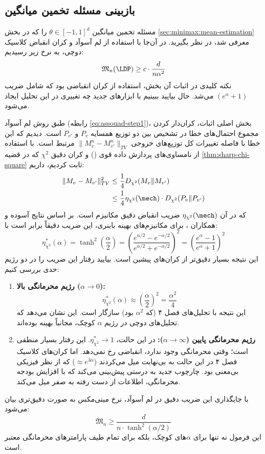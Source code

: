 \subsection{بازبینی مسئله تخمین میانگین}
مسئله تخمین میانگین $\theta \in [-1, 1]^d$ را که در بخش \ref{sec:minimax:mean-estimation} معرفی شد، در نظر بگیرید. در آن‌جا با استفاده از لم آسوآد و کران انقباض کلاسیک دوچی، به نرخ زیر رسیدیم:
\begin{equation}
\mathfrak{M}_n(\text{\LDP}) \ge c \cdot \frac{d}{n \alpha^2}
\end{equation}
نکته کلیدی در اثبات آن بخش، استفاده از کران انقباضی بود که شامل ضریب $(e^\alpha + 1)$ می‌شد. حال بیایید ببینیم با ابزارهای جدید چه تغییری در این تحلیل ایجاد می‌شود.

طبق روش لم آسوآد (رابطه \ref{eq:assouad-step1})، بخش اصلی اثبات، کران‌دار کردن مجموع احتمال‌های خطا در تشخیص بین دو توزیع همسایه $P_v$ و $P_{v'}$ است. دیدیم که این خطا با فاصله تغییرات کل توزیع‌های خروجی $\|M_v^n - M_{v'}^n\|_{TV}$ مرتبط است.
با استفاده از نامساوی‌های پردازش داده قوی () و کران دقیق $\chi^2$ که در قضیه \ref{thm:sharp-chi-square} ثابت کردیم، داریم:
\begin{align}
\|M_v - M_{v'}\|_{TV}^2 &\le \frac{1}{4} D_{\chi^2}(M_v \| M_{v'}) \nonumber \\
&\le \frac{1}{4} \eta_{\chi^2}(\mech) \cdot D_{\chi^2}(P_v \| P_{v'})
\end{align}
که در آن $\eta_{\chi^2}(\mech)$ ضریب انقباض دقیق مکانیزم است. بر اساس نتایج آسوده و همکاران \cite{Asoodeh2024}، برای مکانیزم‌های بهینه باینری، این ضریب دقیقاً برابر است با:
\begin{equation}
\eta_{\chi^2}^*(\alpha) = \tanh^2\left(\frac{\alpha}{2}\right) = \left( \frac{e^{\alpha/2} - e^{-\alpha/2}}{e^{\alpha/2} + e^{-\alpha/2}} \right)^2 = \left( \frac{e^\alpha - 1}{e^\alpha + 1} \right)^2
\end{equation}
این نتیجه بسیار دقیق‌تر از کران‌های پیشین است. بیایید رفتار این ضریب را در دو رژیم حدی بررسی کنیم:

\begin{enumerate}
    \item \textbf{رژیم محرمانگی بالا ($\alpha \to 0$):}
    $$ \eta_{\chi^2}^*(\alpha) \approx \left(\frac{\alpha}{2}\right)^2 = \frac{\alpha^2}{4} $$
    این نتیجه با تحلیل‌های فصل ۴ (که $\alpha^2$ بود) سازگار است. این نشان می‌دهد که تحلیل‌های دوچی در رژیم $\alpha$ کوچک، مجانباً بهینه بوده‌اند.
    
    \item \textbf{رژیم محرمانگی پایین ($\alpha \to \infty$):}
    در این حالت، $\eta_{\chi^2}^* \to 1$. این رفتار بسیار منطقی است؛ وقتی محرمانگی وجود ندارد، انقباضی رخ نمی‌دهد. اما کران‌های کلاسیک فصل ۴ در این حالت به بی‌نهایت میل می‌کردند ($\approx e^{3\alpha}$) که از نظر فیزیکی بی‌معنی بود. چارچوب جدید به درستی پیش‌بینی می‌کند که با افزایش بودجه محرمانگی، اطلاعات از دست رفته به صفر میل می‌کند.
\end{enumerate}

با جایگذاری این ضریب دقیق در لم آسوآد، نرخ مینی‌مکس به صورت دقیق‌تری بیان می‌شود:
\begin{equation}
\mathfrak{M}_n \ge \frac{d}{n \cdot \tanh^2(\alpha/2)}
\end{equation}
این فرمول نه تنها برای $\alpha$های کوچک، بلکه برای تمام طیف پارامترهای محرمانگی معتبر است.
